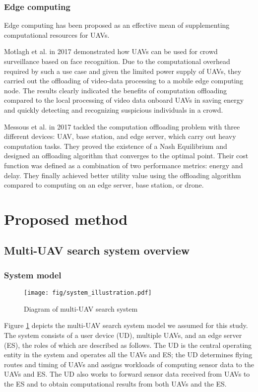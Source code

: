 \documentclass{ieeeaccess}
\begin{document}
\subsubsection{Edge computing}
Edge computing has been proposed as an effective mean of supplementing computational resources for UAVs\cite{Motlagh2017,Messous2017}.

Motlagh et al. in 2017 demonstrated how UAVs can be used for crowd surveillance based on face recognition. Due to the computational overhead required by such a use case and given the limited power supply of UAVs, they carried out the offloading of video-data processing to a mobile edge computing node. The results clearly indicated the benefits of computation offloading compared to the local processing of video data onboard UAVs in saving energy and quickly detecting and recognizing suspicious individuals in a crowd.

Messous et al. in 2017 tackled the computation offloading problem with three different devices: UAV, base station, and edge server, which carry out heavy computation tasks. They proved the existence of a Nash Equilibrium and designed an offloading algorithm that converges to the optimal point. Their cost function was defined as a combination of two performance metrics: energy and delay. They finally achieved better utility value using the offloading algorithm compared to computing on an edge server, base station, or drone.

\section{Proposed method}\label{method}

\subsection{Multi-UAV search system overview}\label{sys}
\subsubsection{System model}\label{sysmo}

\begin{figure}[htbp]
\begin{center}
\texttt{[image: fig/system\_illustration.pdf]}
\caption{Diagram of multi-UAV search system }
\label{model}
\end{center}
\end{figure}


Figure \ref{model} depicts the multi-UAV search system model we assumed for this study. The system consists of a user device (UD), multiple UAVs, and an edge server (ES), the roles of which are described as follows. 
%
The UD is the central operating entity in the system and operates all the UAVs and ES; the UD determines flying routes and timing of UAVs and assigns workloads of computing sensor data to the UAVs and ES.
%
The UD also works to forward sensor data received from UAVs to the ES and to obtain computational results from both UAVs and the ES.
\end{document}
